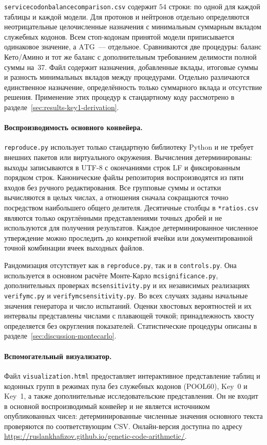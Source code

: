 \documentclass[11pt,a4paper]{article}
\renewcommand{\_}{\origunderscore\allowbreak}
\begin{document}
\texttt{service\_codon\_balance\_comparison.csv} содержит
$54$ строки: по одной для каждой таблицы и каждой модели.
Для протонов и нейтронов отдельно определяются
неотрицательные целочисленные назначения с минимальным
суммарным вкладом служебных кодонов. Всем стоп-кодонам
принятой модели приписывается одинаковое значение,
а $\mathrm{ATG}$~--- отдельное. Сравниваются две процедуры:
баланс Кето/Амино и тот же баланс с дополнительным
требованием делимости полной суммы на~$37$.
Файл содержит назначения, добавленные вклады,
итоговые суммы и разность минимальных вкладов между
процедурами. Отдельно различаются единственное назначение,
определённость только суммарного вклада и отсутствие
решения. Применение этих процедур к стандартному коду
рассмотрено в разделе~\ref{sec:results-key1-derivation}.

\paragraph{Воспроизводимость основного конвейера.}
\texttt{reproduce.py} использует только стандартную библиотеку
Python и не требует внешних пакетов или виртуального окружения.
Вычисления детерминированы: выходы записываются в UTF-8 с окончаниями
строк LF и фиксированным порядком строк. Канонические файлы
репозитория воспроизводятся из пяти входов без ручного редактирования.
Все групповые суммы и остатки вычисляются в целых числах, а отношения
сначала сокращаются точно посредством наибольшего общего делителя.
Десятичные столбцы в \texttt{*\_ratios.csv} являются только
округлёнными представлениями точных дробей и не используются для
получения результатов. Каждое детерминированное численное утверждение
можно проследить до конкретной ячейки или документированной точной
комбинации ячеек выходных файлов.

Рандомизация отсутствует как в \texttt{reproduce.py}, так и в
\texttt{controls.py}. Она используется в основном расчёте
Монте-Карло \texttt{mc\_significance.py}, дополнительных проверках
\texttt{mc\_sensitivity.py} и их независимых реализациях
\texttt{verify\_mc.py} и \texttt{verify\_mc\_sensitivity.py}.
Во всех случаях заданы начальные значения генератора и число
испытаний. Оценки хвостовых вероятностей и их интервалы
представлены числами с плавающей точкой; принадлежность хвосту
определяется без округления показателей. Статистические процедуры
описаны в разделе~\ref{sec:discussion-montecarlo}.

\paragraph{Вспомогательный визуализатор.}
Файл \texttt{visualization.html} предоставляет интерактивное
представление таблиц и кодонных групп в режимах пула без служебных
кодонов (POOL60), Key~0 и Key~1, а также дополнительные
исследовательские представления. Он не входит в основной
воспроизводимый конвейер и не является источником опубликованных
чисел: детерминированные численные значения основного текста
проверяются по соответствующим CSV. Онлайн-версия доступна по адресу
\url{https://ruslankhafizov.github.io/genetic-code-arithmetic/}.
\end{document}
